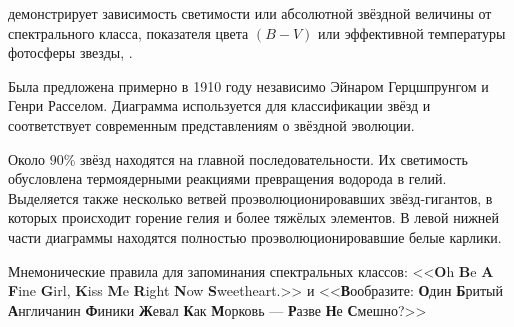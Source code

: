 
 демонстрирует зависимость светимости или абсолютной звёздной величины от спектрального класса, показателя цвета $(B-V)$ или эффективной температуры фотосферы звезды, .

Была предложена примерно в 1910 году независимо Эйнаром Герцшпрунгом и Генри Расселом. Диаграмма используется для классификации звёзд и соответствует современным представлениям о звёздной эволюции.

Около $90 \%$ звёзд находятся на главной последовательности. Их светимость обусловлена термоядерными реакциями превращения водорода в гелий. Выделяется также несколько ветвей проэволюционировавших звёзд-гигантов, в которых происходит горение гелия и более тяжёлых элементов. В левой нижней части диаграммы находятся полностью проэволюционировавшие белые карлики.

Мнемонические правила для запоминания спектральных классов: <<\textbf{O}h \textbf{B}e \textbf{A} \textbf{F}ine \textbf{G}irl, \textbf{K}iss \textbf{M}e \textbf{R}ight \textbf{N}ow \textbf{S}weetheart.>> и <<\textbf{В}ообразите: \textbf{О}дин \textbf{Б}ритый \textbf{А}нгличанин \textbf{Ф}иники \textbf{Ж}евал \textbf{К}ак \textbf{М}орковь --- \textbf{Р}азве \textbf{Н}е \textbf{С}мешно?>>

